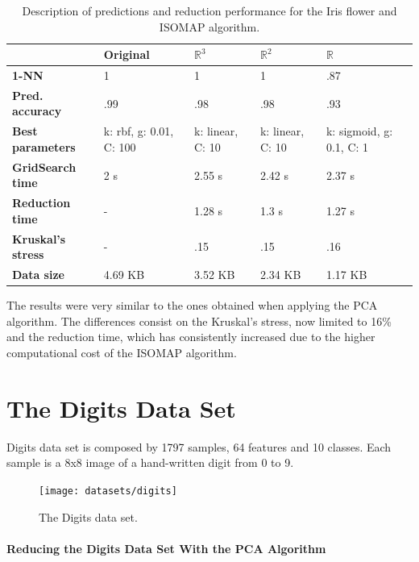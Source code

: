 \begin{table}[H]
	\centering
	
	\begin{tabular}{|p{.25\linewidth}|p{.15\linewidth}|p{.15\linewidth}|p{.15\linewidth}|p{.15\linewidth}|}
		\hline
		& \textbf{Original} & $\mathbb{R}^3$ & $\mathbb{R}^2$ & $\mathbb{R}$ \\\hline
		\textbf{1-NN} & 1 & 1 & 1 & .87 \\\hline
		\textbf{Pred. accuracy} & .99 & .98 & .98 & .93 \\\hline
		\textbf{Best parameters} & k: rbf, g: 0.01, C: 100 & k: linear, C: 10 & k: linear, C: 10 & k: sigmoid, g: 0.1, C: 1 \\\hline
		\textbf{GridSearch time} & 2 s & 2.55 s & 2.42 s & 2.37 s \\\hline
		\textbf{Reduction time} & - & 1.28 s & 1.3 s & 1.27 s \\\hline
		\textbf{Kruskal's stress} & - & .15 & .15 & .16 \\\hline
		\textbf{Data size} & 4.69 KB & 3.52 KB & 2.34 KB & 1.17 KB \\\hline
	\end{tabular}
	\captionsetup{justification=centering}
	\caption{Description of predictions and reduction performance for the Iris flower and ISOMAP algorithm.}
\end{table}

The results were very similar to the ones obtained when applying the PCA algorithm. The differences consist on the Kruskal's stress, now limited to 16\% and the reduction time, which has consistently increased due to the higher computational cost of the ISOMAP algorithm.

\clearpage
\section{The Digits Data Set}

Digits data set is composed by 1797 samples, 64 features and 10 classes. Each sample is a 8x8 image of a hand-written digit from 0 to 9.
\newline\newline

\begin{figure}[H]
	\centering
	\captionsetup{justification=centering}
	\texttt{[image: datasets/digits]}
	\caption{The Digits data set.}
\end{figure}

\newpage
\paragraph{Reducing the Digits Data Set With the PCA Algorithm}

